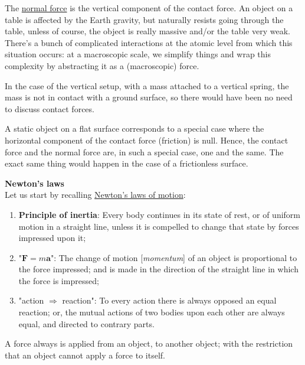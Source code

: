 \documentclass[solutions.tex]{subfiles}
\renewcommand{\bm}[1]{\pmb{#1}}
\begin{document}
The \href{https://en.wikipedia.org/wiki/Normal\_force}{normal force}
is the vertical component of the contact force. An object on a table
is affected by the Earth gravity, but naturally resists going through the
table, unless of course, the object is really massive and/or the table
very weak. There's a bunch of complicated interactions at the atomic
level from which this situation occurs: at a macroscopic scale, we
simplify things and wrap this complexity by abstracting it as
a (macroscopic) force.

\begin{remark} In the case of the vertical setup, with a mass attached
to a vertical spring, the mass is not in contact with a ground surface,
so there would have been no need to discuss contact forces.
\end{remark}

\begin{remark} A static object on a flat surface corresponds to a
special case where the horizontal component of the contact force (friction)
is null. Hence, the contact force and the normal force are, in such a special
case, one and the same. The exact same thing would happen in the
case of a frictionless surface.
\end{remark}

\hr
\textbf{Newton's laws} \\
Let us start by recalling
\href{https://en.wikipedia.org/wiki/Newton\%27s\_laws\_of\_motion}
{Newton's laws of motion}:

\begin{enumerate}
	\item \textbf{Principle of inertia}: Every body continues in
	its state of rest, or of uniform motion in a straight line,
	unless it is compelled to change that state by forces
	impressed upon it;
	\item "$\bm{F} = m\bm{a}$": The change of motion
	[\textit{momentum}] of an object is proportional to the force
	impressed; and is made in the direction of the straight line in
	which the force is impressed;
	\item "action $\Rightarrow$ reaction":
	To every action there is always opposed an equal reaction;
	or, the mutual actions of two bodies upon each other are always
	equal, and directed to contrary parts.
\end{enumerate}

\begin{remark} A force always is applied from an object, to another object;
with the restriction that an object cannot apply a force to itself.
\end{remark}
\end{document}
